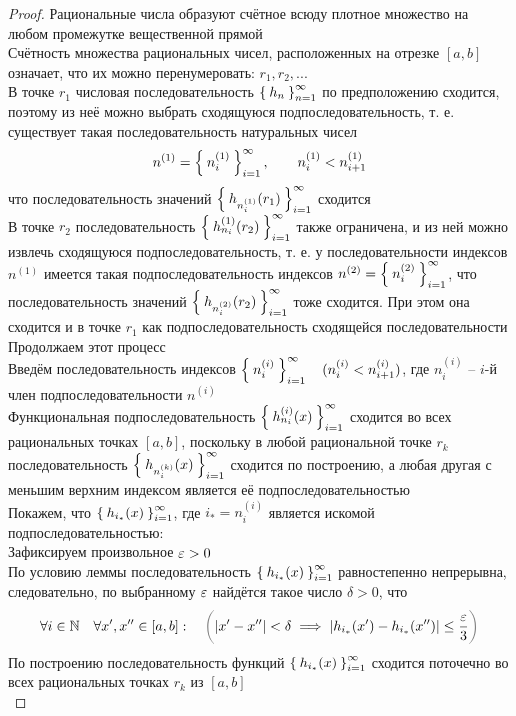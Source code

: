 \begin{proof}
	Рациональные числа образуют счётное всюду плотное множество на любом промежутке вещественной прямой \\
    Счётность множества рациональных чисел, расположенных на отрезке $ [a, b] $ означает, что их можно перенумеровать: $ r_1, r_2, ... $ \\
    В точке $ r_1 $ числовая последовательность $ \Set{h_n}_{n=1}^{\infty} $ по предположению сходится, поэтому из неё можно выбрать сходящуюся подпоследовательность, т. е. существует такая последовательность натуральных чисел
    $$ n^{(1)} = \Set{n_i^{(1)}}_{i=1}^{\infty}, \qquad n_i^{(1)} < n_{i + 1}^{(1)} $$
    что последовательность значений $ \Set{h_{n_i^{(1)}}(r_1)}_{i=1}^{\infty} $ сходится \\
    В точке $ r_2 $ последовательность $ \Set{h_{n_i}^{(1)}(r_2)}_{i=1}^{\infty} $ также ограничена, и из ней можно извлечь сходящуюся подпоследовательность, т. е. у последовательности индексов $ n^{(1)} $ имеется такая подпоследовательность индексов $ n^{(2)} = \Set{n_i^{(2)}}_{i=1}^{\infty} $, что последовательность значений $ \Set{h_{n_i^{(2)}}(r_2)}_{i=1}^{\infty} $ тоже сходится. При этом она сходится и в точке $ r_1 $ как подпоследовательность сходящейся последовательности \\
    Продолжаем этот процесс \\
    Введём последовательность индексов $ \Set{n_i^{(i)}}_{i=1}^{\infty} \quad (n_i^{(i)} < n_{i + 1}^{(i)}) $, где $ n_i^{(i)} $ -- $ i $-й член подпоследовательности $ n^{(i)} $ \\
    Функциональная подпоследовательность $ \Set{h_{n_i}^{(i)}(x)}_{i=1}^{\infty} $ сходится во всех рациональных точках $ [a, b] $, поскольку в любой рациональной точке $ r_k $ последовательность $ \Set{h_{n_i^{(k)}}(x)}_{i=1}^{\infty} $ сходится по построению, а любая другая с меньшим верхним индексом является её подпоследовательностью \\
    Покажем, что $ \Set{h_{i_*}(x)}_{i=1}^{\infty} $, где $ i_* = n_i^{(i)} $ является искомой подпоследовательностью: \\
    Зафиксируем произвольное $ \varepsilon > 0 $ \\
    По условию леммы последовательность $ \Set{h_{i_*}(x)}_{i=1}^{\infty} $ равностепенно непрерывна, следовательно, по выбранному $ \varepsilon $ найдётся такое число $ \delta > 0 $, что
    $$ \forall i \in \N \quad \forall x', x'' \in [a, b] : \quad \nimp[\bigg(] |x' - x''| < \delta \implies |h_{i_*}(x') - h_{i_*}(x'')| \le \frac\veps3 \nimp[\bigg)] $$
    По построению последовательность функций $ \Set{h_{i_*}(x)}_{i=1}^{\infty} $ сходится поточечно во всех рациональных точках $ r_k $ из $ [a, b] $ \\

\end{proof}
